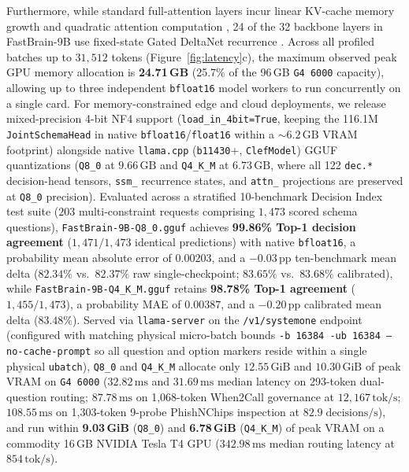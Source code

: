 \documentclass[10pt,twocolumn]{article}
\begin{document}
Furthermore, while standard full-attention layers incur linear KV-cache memory growth and quadratic attention computation \citep{dao2022flashattention}, 24 of the 32 backbone layers in FastBrain-9B use fixed-state Gated DeltaNet recurrence \citep{yang2025gateddeltanet}. Across all profiled batches up to $31{,}512$ tokens (Figure~\ref{fig:latency}c), the maximum observed peak GPU memory allocation is \textbf{24.71\,GB} (25.7\% of the 96\,GB \texttt{G4 6000} capacity), allowing up to three independent \texttt{bfloat16} model workers to run concurrently on a single card. For memory-constrained edge and cloud deployments, we release mixed-precision 4-bit NF4 support (\texttt{load\_in\_4bit=True}, keeping the 116.1M \texttt{JointSchemaHead} in native \texttt{bfloat16}/\texttt{float16} within a $\sim 6.2\,\text{GB}$ VRAM footprint) alongside native \texttt{llama.cpp} (\texttt{b11430}+, \texttt{ClefModel}) GGUF quantizations (\texttt{Q8\_0} at $9.66\,\text{GB}$ and \texttt{Q4\_K\_M} at $6.73\,\text{GB}$, where all 122 \texttt{dec.*} decision-head tensors, \texttt{ssm\_} recurrence states, and \texttt{attn\_} projections are preserved at \texttt{Q8\_0} precision). Evaluated across a stratified 10-benchmark Decision Index test suite ($203$ multi-constraint requests comprising $1{,}473$ scored schema questions), \texttt{FastBrain-9B-Q8\_0.gguf} achieves \textbf{99.86\% Top-1 decision agreement} ($1{,}471 / 1{,}473$ identical predictions) with native \texttt{bfloat16}, a probability mean absolute error of $0.00203$, and a $-0.03$\,pp ten-benchmark mean delta ($82.34\%$ vs.\ $82.37\%$ raw single-checkpoint; $83.65\%$ vs.\ $83.68\%$ calibrated), while \texttt{FastBrain-9B-Q4\_K\_M.gguf} retains \textbf{98.78\% Top-1 agreement} ($1{,}455 / 1{,}473$), a probability MAE of $0.00387$, and a $-0.20$\,pp calibrated mean delta ($83.48\%$). Served via \texttt{llama-server} on the \texttt{/v1/systemone} endpoint (configured with matching physical micro-batch bounds \texttt{-b 16384 -ub 16384 --no-cache-prompt} so all question and option markers reside within a single physical \texttt{ubatch}), \texttt{Q8\_0} and \texttt{Q4\_K\_M} allocate only $12.55\,\text{GiB}$ and $10.30\,\text{GiB}$ of peak VRAM on \texttt{G4 6000} ($32.82\,\text{ms}$ and $31.69\,\text{ms}$ median latency on 293-token dual-question routing; $87.78\,\text{ms}$ on 1,068-token When2Call governance at $12{,}167\,\text{tok/s}$; $108.55\,\text{ms}$ on 1,303-token 9-probe PhishNChips inspection at $82.9\;\text{decisions/s}$), and run within \textbf{9.03\,GiB} (\texttt{Q8\_0}) and \textbf{6.78\,GiB} (\texttt{Q4\_K\_M}) of peak VRAM on a commodity 16\,GB NVIDIA Tesla T4 GPU ($342.98\,\text{ms}$ median routing latency at $854\,\text{tok/s}$).
\end{document}
